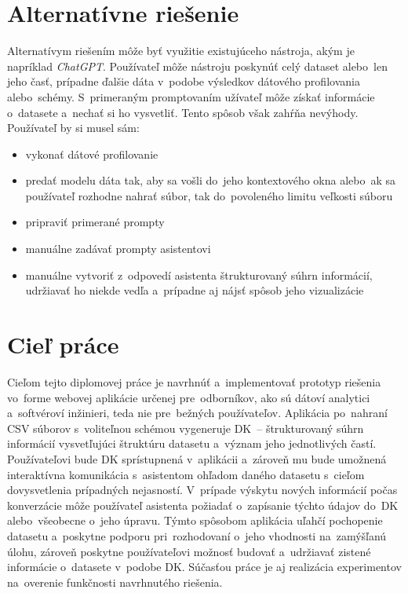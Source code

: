 \section{Alternatívne riešenie}

Alternatívym riešením môže byť využitie existujúceho nástroja, akým je napríklad \textit{ChatGPT}. Používateľ môže nástroju poskynúť celý dataset alebo~len jeho časť, prípadne ďalšie dáta v~podobe výsledkov dátového profilovania alebo~schémy. S~primeraným promptovaním užívateľ môže získať informácie o~datasete a~nechať si ho vysvetliť. Tento spôsob však zahŕňa nevýhody. Používateľ by si musel sám:
\begin{itemize}
\item vykonať dátové profilovanie
\item predať modelu dáta tak, aby sa vošli do~jeho kontextového okna alebo~ak sa používateľ rozhodne nahrať súbor, tak do~povoleného limitu veľkosti súboru
\item pripraviť primerané prompty
\item manuálne zadávať prompty asistentovi
\item manuálne vytvoriť z~odpovedí asistenta štrukturovaný súhrn informácií, udržiavať ho niekde vedľa a~prípadne aj nájsť spôsob jeho vizualizácie
\end{itemize}

\section{Cieľ práce}

Cieľom tejto diplomovej práce je navrhnúť a~implementovať prototyp riešenia vo~forme webovej aplikácie určenej pre~odborníkov, ako sú dátoví analytici a~softvéroví inžinieri, teda nie pre~bežných používateľov. Aplikácia po~nahraní CSV súborov s~voliteľnou schémou vygeneruje DK~-- štrukturovaný súhrn informácií vysvetľujúci štruktúru datasetu a~význam jeho jednotlivých častí. Používateľovi bude DK sprístupnená v~aplikácii a~zároveň mu bude umožnená interaktívna komunikácia s~asistentom ohľadom daného datasetu s~cieľom dovysvetlenia prípadných nejasností. V~prípade výskytu nových informácií počas konverzácie môže používateľ asistenta požiadať o~zapísanie týchto údajov do~DK alebo~všeobecne o~jeho úpravu. Týmto spôsobom aplikácia uľahčí pochopenie datasetu a~poskytne podporu pri~rozhodovaní o~jeho vhodnosti na~zamýšľanú úlohu, zároveň poskytne používateľovi možnosť budovať a~udržiavať zistené informácie o~datasete v~podobe DK. Súčasťou práce je aj realizácia experimentov na~overenie funkčnosti navrhnutého riešenia.
